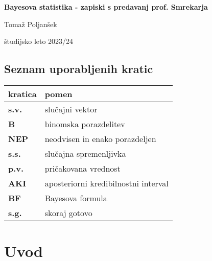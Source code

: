 \documentclass[a4paper, 12pt]{book}
\title{\ttitle}
\author{\tauthor}
\date{\tdate}
\newcommand{\ttitle}{Bayesova statistika - zapiski s predavanj prof. Smrekarja}
\newcommand{\tauthor}{Tomaž Poljanšek}
\newcommand{\tdate}{študijsko leto 2023/24}
\theoremstyle{definition}
\theoremstyle{remark}
\newcommand\mymaketitle{
  \begin{titlepage}
    \begin{center}
        \vspace*{4cm}
        \Huge
        \textbf{\ttitle}
                        
        \vspace{1.5cm}
        \huge
        \tauthor
            
        \vspace{3cm}
        \Large
        \tdate
    \end{center}
  \end{titlepage}
}
\begin{document}
\renewcommand{\thepage}{}
\newcommand{\sn}[1]{"`#1"'}

\mymaketitle

\clearpage
\frontmatter

\pagestyle{empty}
\def\thepage{}
\tableofcontents{}

\def\x{\hspace{3ex}}    %
\def\y{\hspace{2.45ex}}  %
\def\z{\hspace{1.9ex}}    %
\stackMath

\clearpage
{}

\section*{Seznam uporabljenih kratic}

\noindent\begin{tabular}{p{}|p{}}
  {\bf kratica} & {pomen} \\
  \hline
  {\bf s.v.} & {slučajni vektor} \\
  {\bf B} & {binomska porazdelitev} \\
  {\bf NEP} & {neodvisen in enako porazdeljen} \\
  {\bf s.s.} & {slučajna spremenljivka} \\
  {\bf p.v.} & {pričakovana vrednost} \\
  {\bf AKI} & {aposteriorni kredibilnostni interval} \\
  {\bf BF} & {Bayesova formula} \\
  {\bf s.g.} & {skoraj gotovo} \\
\end{tabular}



\mainmatter
\setcounter{page}{1}
\pagestyle{fancy}




\chapter{Uvod}
\end{document}
